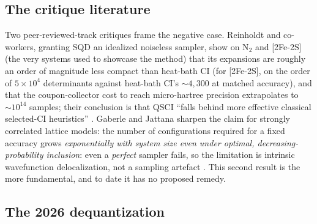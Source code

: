 \documentclass[11pt]{article}
\begin{document}
\subsection{The critique literature}\label{sec:5-2}

Two peer-reviewed-track critiques frame the negative case. Reinholdt and co-workers, granting SQD an idealized noiseless sampler, show on N$_2$ and [2Fe-2S] (the very systems used to showcase the method) that its expansions are roughly an order of magnitude less compact than heat-bath CI (for [2Fe-2S], on the order of $5\times10^{4}$ determinants against heat-bath CI's ${\sim}4{,}300$ at matched accuracy), and that the coupon-collector cost to reach micro-hartree precision extrapolates to $\sim10^{14}$ samples; their conclusion is that QSCI ``falls behind more effective classical selected-CI heuristics'' \cite{reinholdt2025}. Gaberle and Jattana sharpen the claim for strongly correlated lattice models: the number of configurations required for a fixed accuracy grows \emph{exponentially with system size even under optimal, decreasing-probability inclusion}: even a \emph{perfect} sampler fails, so the limitation is intrinsic wavefunction delocalization, not a sampling artefact \cite{gaberle2026}. This second result is the more fundamental, and to date it has no proposed remedy.


\subsection{The 2026 dequantization}\label{sec:5-3}
\end{document}
